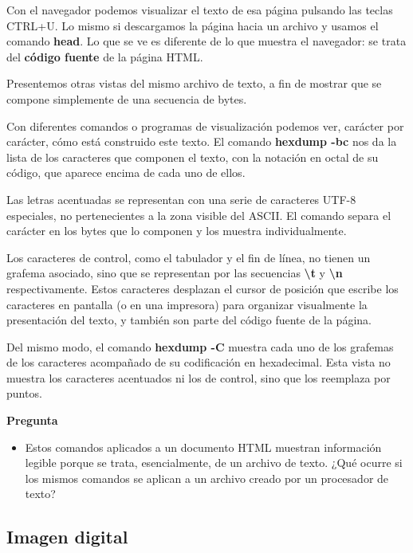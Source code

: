 \documentclass[spanish,A4,]{article}
\begin{document}
Con el navegador podemos visualizar el texto de esa página pulsando las
teclas CTRL+U. Lo mismo si descargamos la página hacia un archivo y
usamos el comando \textbf{head}. Lo que se ve es diferente de lo que
muestra el navegador: se trata del \textbf{código fuente} de la página
HTML.

Presentemos otras vistas del mismo archivo de texto, a fin de mostrar
que se compone simplemente de una secuencia de bytes.

Con diferentes comandos o programas de visualización podemos ver,
carácter por carácter, cómo está construido este texto. El comando
\textbf{hexdump -bc} nos da la lista de los caracteres que componen el
texto, con la notación en octal de su código, que aparece encima de cada
uno de ellos.

Las letras acentuadas se representan con una serie de caracteres UTF-8
especiales, no pertenecientes a la zona visible del ASCII. El comando
separa el carácter en los bytes que lo componen y los muestra
individualmente.

Los caracteres de control, como el tabulador y el fin de línea, no
tienen un grafema asociado, sino que se representan por las secuencias
\textbf{\textbackslash{}t} y \textbf{\textbackslash{}n} respectivamente.
Estos caracteres desplazan el cursor de posición que escribe los
caracteres en pantalla (o en una impresora) para organizar visualmente
la presentación del texto, y también son parte del código fuente de la
página.

Del mismo modo, el comando \textbf{hexdump -C} muestra cada uno de los
grafemas de los caracteres acompañado de su codificación en hexadecimal.
Esta vista no muestra los caracteres acentuados ni los de control, sino
que los reemplaza por puntos.

\textbf{Pregunta}

\begin{itemize}
\itemsep1pt\parskip0pt
\item
  Estos comandos aplicados a un documento HTML muestran información
  legible porque se trata, esencialmente, de un archivo de texto. ¿Qué
  ocurre si los mismos comandos se aplican a un archivo creado por un
  procesador de texto?
\end{itemize}

\subsection{Imagen digital}\label{imagen-digital}
\end{document}
